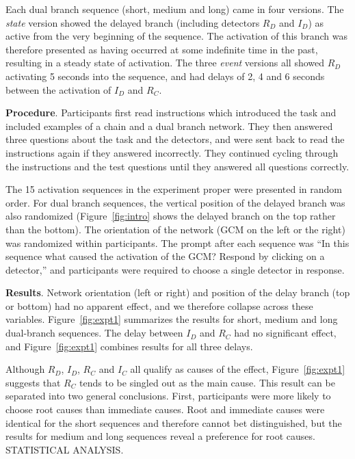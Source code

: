 \documentclass[10pt,letterpaper]{article}
\newcommand{\ev}[2]{$#1_#2$}
\begin{document}
Each dual branch sequence (short, medium and long) came in four versions. The \emph{state} version showed the delayed branch (including detectors \ev{R}{D} and \ev{I}{D}) as active from the very beginning of the sequence. The activation of this branch was therefore presented as having occurred at some indefinite time in the past, resulting in a steady state of activation. The three \emph{event} versions all showed \ev{R}{D} activating 5 seconds into the sequence, and had delays of 2, 4 and 6 seconds between the activation of \ev{I}{D} and \ev{R}{C}.


\textbf{Procedure}. 
Participants first read instructions which introduced the task and included examples of a chain and a dual branch network. They then answered three questions about the task and the detectors, and were sent back to read the instructions again if they answered incorrectly. They continued cycling through the instructions and the test questions until they answered all questions correctly.

The 15 activation sequences in the experiment proper were presented in random order. For dual branch sequences, the vertical position of the delayed branch was also randomized (Figure~\ref{fig:intro} shows the delayed branch on the top rather than the bottom). The orientation of the network (GCM on the left or the right) was randomized within participants.  The prompt after each sequence was ``In this sequence what caused the activation of the GCM? Respond by clicking on a detector,'' and participants were required to choose a single detector in response. 

\textbf{Results}. 
Network orientation (left or right) and position of the delay branch (top or bottom) had no apparent effect, and we therefore collapse across these variables. Figure~\ref{fig:expt1} summarizes the results for short, medium and long dual-branch sequences. The delay between \ev{I}{D} and \ev{R}{C} had no significant effect, and Figure~\ref{fig:expt1} combines results for all three delays.  

Although \ev{R}{D}, \ev{I}{D}, \ev{R}{C} and \ev{I}{C} all qualify as causes of the effect, Figure~\ref{fig:expt1} suggests that \ev{R}{C} tends to be singled out as the main cause. This result can be separated into two general conclusions.  First,  participants were more likely to choose root causes than immediate causes. Root and immediate causes were identical for the short sequences and therefore cannot bet distinguished, but the results for medium and long sequences reveal a preference for root causes. STATISTICAL ANALYSIS. 
\end{document}
